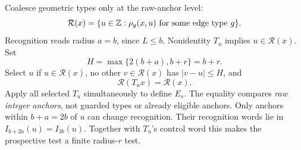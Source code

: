 \documentclass[11pt,a4paper]{article}
\numberwithin{equation}{section}
\newcommand{\Rec}{\mathcal R}\newcommand{\Sel}{\mathcal S}
\newcommand{\Es}{E_s}\newcommand{\Ps}{P_s}\newcommand{\Fs}{F_s}\newcommand{\Cand}{\mathcal C_P}
\begin{document}
Coalesce geometric types only at the raw-anchor level:
\[
\Rec(x)=\{u\in\Z:\rho_g(x,u)\text{ for some edge type }g\}.
\]
Recognition reads radius $a=b$, since $L\le b$. Nonidentity $T_u$ implies $u\in\Rec(x)$. Set
\begin{equation}\label{fpa:sw:eq:edge-select}
H=\max\{2(b+a),b+r\}=b+r.
\end{equation}
Select $u$ if $u\in\Rec(x)$, no other $v\in\Rec(x)$ has $|v-u|\le H$, and
\begin{equation}\label{fpa:sw:eq:edge-prospective}
\Rec(T_ux)=\Rec(x).
\end{equation}
Apply all selected $T_u$ simultaneously to define $\Es$. The equality compares \emph{raw integer anchors}, not guarded types or already eligible anchors. Only anchors within $b+a=2b$ of $u$ can change recognition. Their recognition words lie in $I_{b+2a}(u)=I_{3b}(u)$. Together with $T_u$'s control word this makes the prospective test a finite radius-$r$ test.
\end{document}
